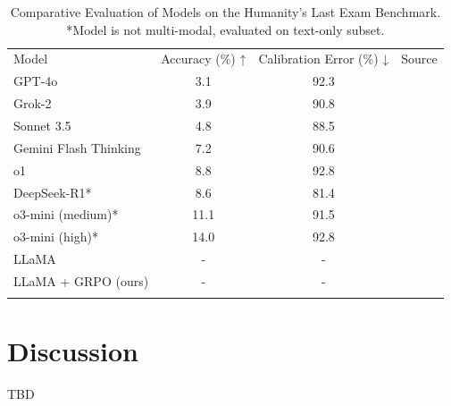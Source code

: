 \documentclass{svproc}
\begin{document}
\begin{table}[H]
\centering
\begin{tabular}{lccc}
Model                   & Accuracy (\%) ↑ & Calibration Error (\%) ↓ & Source \\
GPT-4o                  & 3.1             & 92.3                      & \cite{phan2025humanitysexam} \\
Grok-2                  & 3.9             & 90.8                      & \cite{phan2025humanitysexam} \\
Sonnet 3.5              & 4.8             & 88.5                      & \cite{phan2025humanitysexam} \\
Gemini Flash Thinking   & 7.2             & 90.6                      & \cite{phan2025humanitysexam} \\
o1                      & 8.8             & 92.8                      & \cite{phan2025humanitysexam} \\
DeepSeek-R1*            & 8.6             & 81.4                      & \cite{phan2025humanitysexam} \\
o3-mini (medium)*       & 11.1            & 91.5                      & \cite{phan2025humanitysexam} \\
o3-mini (high)*         & 14.0            & 92.8                      & \cite{phan2025humanitysexam} \\
LLaMA                   & -               & -                         &  \\
LLaMA + GRPO (ours)     & -               & -                         &  \\
\\
\end{tabular}
\caption{
  Comparative Evaluation of Models on the Humanity's Last Exam Benchmark.
  *Model is not multi-modal, evaluated on text-only subset.
  }
  \label{tab:results}
\end{table}



\section{Discussion}
TBD

\end{document}
